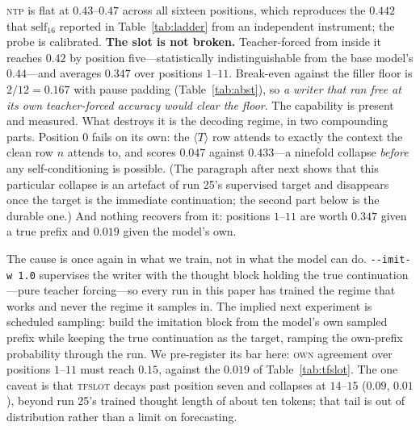 \documentclass{article} %
\begin{document}
\textsc{ntp} is flat at $0.43$--$0.47$ across all sixteen positions, which reproduces the $0.442$
that $\mathrm{self}_{16}$ reported in Table~\ref{tab:ladder} from an independent instrument; the
probe is calibrated. \textbf{The slot is not broken.} Teacher-forced from inside it reaches $0.42$
by position five---statistically indistinguishable from the base model's $0.44$---and averages
$0.347$ over positions $1$--$11$. Break-even against the filler floor is $2/12 = 0.167$ with pause
padding (Table~\ref{tab:abst}), so \emph{a writer that ran free at its own teacher-forced accuracy
would clear the floor}. The capability is present and measured. What destroys it is the decoding
regime, in two compounding parts. Position $0$ fails on its own: the $\langle T\rangle$ row attends
to exactly the context the clean row $n$ attends to, and scores $0.047$ against $0.433$---a ninefold
collapse \emph{before} any self-conditioning is possible. (The paragraph after next shows that this
particular collapse is an artefact of run 25's supervised target and disappears once the target is
the immediate continuation; the second part below is the durable one.) And nothing recovers from
it: positions $1$--$11$ are worth $0.347$ given a true prefix and $0.019$ given the model's own.

The cause is once again in what we train, not in what the model can do. \verb|--imit-w 1.0|
supervises the writer with the thought block holding the true continuation---pure teacher
forcing---so every run in this paper has trained the regime that works and never the regime it
samples in. The implied next experiment is scheduled sampling: build the imitation block from the
model's own sampled prefix while keeping the true continuation as the target, ramping the
own-prefix probability through the run. We pre-register its bar here: \textsc{own} agreement over
positions $1$--$11$ must reach $0.15$, against the $0.019$ of Table~\ref{tab:tfslot}. The one caveat
is that \textsc{tfslot} decays past position seven and collapses at $14$--$15$ ($0.09$, $0.01$),
beyond run 25's trained thought length of about ten tokens; that tail is out of distribution rather
than a limit on forecasting.
\end{document}
